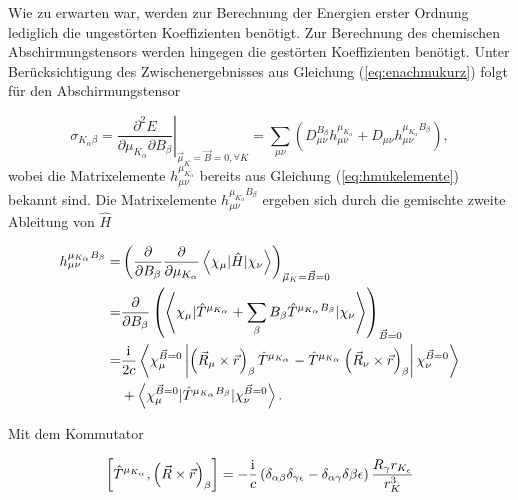     Wie zu erwarten war, werden zur Berechnung der Energien erster Ordnung lediglich die ungestörten Koeffizienten benötigt. Zur Berechnung des chemischen Abschirmungstensors werden hingegen die gestörten Koeffizienten benötigt. Unter Berücksichtigung des Zwischenergebnisses aus Gleichung (\ref{eq:enachmukurz}) folgt für den Abschirmungstensor
    
    \begin{equation}\label{eq:analytsigma}
    \sigma_{K_\alpha\beta}=\left.\frac{\partial^2 E}{\partial \mu_{K_\alpha}\partial B_\beta}\right|_{\vec{\mu}_K=\vec{B}=0,\forall K}=\sum_{\mu\nu}\left(D_{\mu\nu}^{B_\beta}h_{\mu\nu}^{\mu_{K_\alpha}}+D_{\mu\nu}h_{\mu\nu}^{\mu_{K_\alpha}B_\beta}\right),
    \end{equation}
    wobei die Matrixelemente $h_{\mu\nu}^{\mu_{K_\alpha}}$ bereits aus Gleichung (\ref{eq:hmukelemente}) bekannt sind. Die Matrixelemente $h_{\mu\nu}^{\mu_{K_\alpha}B_\beta}$ ergeben sich durch die gemischte zweite Ableitung von $\hat{H}$
    
    \begin{equation}
    \begin{aligned}
    h_{\mu\nu}^{\mu_{K_\alpha}B_\beta}=&\left(\frac{\partial}{\partial B_\beta}\frac{\partial}{\partial \mu_{K_\alpha}}\left\langle\chi_\mu\vert\hat{H}\vert\chi_\nu \right\rangle\right)_{\vec{\mu}_K=\vec{B}=0}\\
    =&\frac{\partial}{\partial B_\beta}\left(\left\langle\chi_\mu\vert\hat{T}^{\mu_{K_\alpha}}+\sum_\beta B_\beta \hat{T}^{\mu_{K_\alpha}B_\beta}\vert\chi_\nu\right\rangle\right)_{\vec{B}=0}\\
    =&\frac{\mathrm{i}\mkern1mu}{2c}\left\langle\chi_\mu^{\vec{B}=0}\left\vert\left(\vec{R}_\mu\times\vec{r}\right)_\beta\hat{T}^{\mu_{K_\alpha}}-\hat{T}^{\mu_{K_\alpha}}\left(\vec{R}_\nu\times\vec{r}\right)_\beta\right\vert\chi_\nu^{\vec{B}=0}\right\rangle\\
    &+\left\langle\chi_\mu^{\vec{B}=0}\vert\hat{T}^{\mu_{K_\alpha}B_\beta}\vert\chi_\nu^{\vec{B}=0}\right\rangle.
    \end{aligned}
	\end{equation}     
      
    Mit dem Kommutator\supercite{baron1991}
    
    \begin{equation}
    \left[\hat{T}^{\mu_{K_\alpha}},\left(\vec{R}\times\vec{r}\right)_\beta\right]=-\frac{\mathrm{i}\mkern1mu}{c}\left(\delta_{\alpha\beta}\delta_{\gamma\epsilon}-\delta_{\alpha\gamma}\delta{\beta\epsilon}\right)\frac{R_\gamma r_{K_\epsilon}}{r_K^3}
    \end{equation}
    
